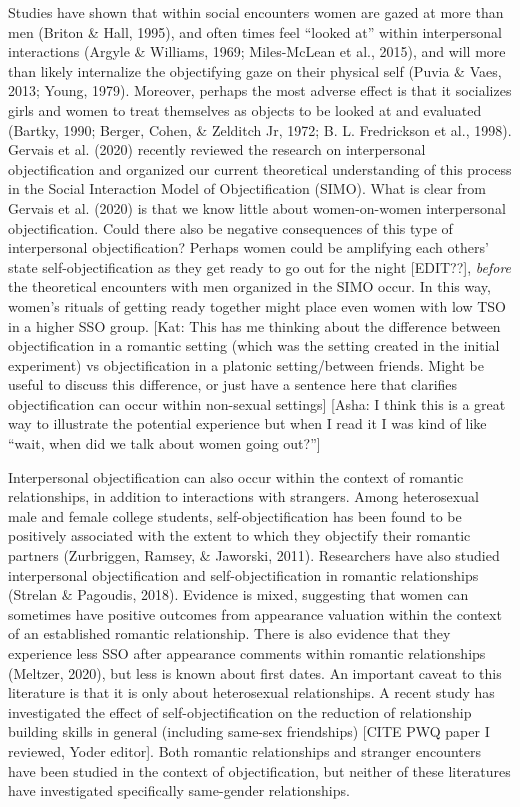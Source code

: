 \documentclass[man]{apa6}
\begin{document}
Studies have shown that within social encounters women are gazed at more
than men (Briton \& Hall, 1995), and often times feel \enquote{looked
at} within interpersonal interactions (Argyle \& Williams, 1969;
Miles-McLean et al., 2015), and will more than likely internalize the
objectifying gaze on their physical self (Puvia \& Vaes, 2013; Young,
1979). Moreover, perhaps the most adverse effect is that it socializes
girls and women to treat themselves as objects to be looked at and
evaluated (Bartky, 1990; Berger, Cohen, \& Zelditch Jr, 1972; B. L.
Fredrickson et al., 1998). Gervais et al. (2020) recently reviewed the
research on interpersonal objectification and organized our current
theoretical understanding of this process in the Social Interaction
Model of Objectification (SIMO). What is clear from Gervais et al.
(2020) is that we know little about women-on-women interpersonal
objectification. Could there also be negative consequences of this type
of interpersonal objectification? Perhaps women could be amplifying each
others' state self-objectification as they get ready to go out for the
night {[}EDIT??{]}, \emph{before} the theoretical encounters with men
organized in the SIMO occur. In this way, women's rituals of getting
ready together might place even women with low TSO in a higher SSO
group. {[}Kat: This has me thinking about the difference between
objectification in a romantic setting (which was the setting created in
the initial experiment) vs objectification in a platonic setting/between
friends. Might be useful to discuss this difference, or just have a
sentence here that clarifies objectification can occur within non-sexual
settings{]} {[}Asha: I think this is a great way to illustrate the
potential experience but when I read it I was kind of like
\enquote{wait, when did we talk about women going out?}{]}

Interpersonal objectification can also occur within the context of
romantic relationships, in addition to interactions with strangers.
Among heterosexual male and female college students,
self-objectification has been found to be positively associated with the
extent to which they objectify their romantic partners (Zurbriggen,
Ramsey, \& Jaworski, 2011). Researchers have also studied interpersonal
objectification and self-objectification in romantic relationships
(Strelan \& Pagoudis, 2018). Evidence is mixed, suggesting that women
can sometimes have positive outcomes from appearance valuation within
the context of an established romantic relationship. There is also
evidence that they experience less SSO after appearance comments within
romantic relationships (Meltzer, 2020), but less is known about first
dates. An important caveat to this literature is that it is only about
heterosexual relationships. A recent study has investigated the effect
of self-objectification on the reduction of relationship building skills
in general (including same-sex friendships) {[}CITE PWQ paper I
reviewed, Yoder editor{]}. Both romantic relationships and stranger
encounters have been studied in the context of objectification, but
neither of these literatures have investigated specifically same-gender
relationships.
\end{document}
